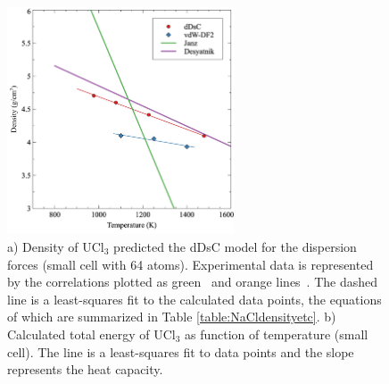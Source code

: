 \documentclass[preprint,3p,10pt,onecolumn,number,sort&compress]{elsarticle}
\begin{document}

\begin{figure}[htb]
\centering
\includegraphics[width=0.6\textwidth]{fig5.jpg}
\caption{a) Density of UCl$_3$ predicted the dDsC model for the dispersion forces (small cell with 64 atoms). Experimental data is represented by the correlations plotted as green~\cite{Desyatnik} and orange lines~\cite{Janz1988}. The dashed line is a least-squares fit to the calculated data points, the equations of which are summarized in Table \ref{table:NaCldensityetc}. b) Calculated total energy of UCl$_3$ as function of temperature (small cell). The line is a least-squares fit to data points and the slope represents the heat capacity.} 
\label{fig:UCl3density}
\end{figure}
\end{document}
